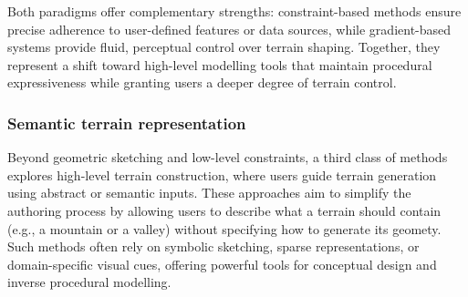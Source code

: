 \smallConclusion

Both paradigms offer complementary strengths: constraint-based methods ensure precise adherence to user-defined features or data sources, while gradient-based systems provide fluid, perceptual control over terrain shaping. Together, they represent a shift toward high-level modelling tools that maintain procedural expressiveness while granting users a deeper degree of terrain control.

\subsubsection{Semantic terrain representation}

Beyond geometric sketching and low-level constraints, a third class of methods explores high-level terrain construction, where users guide terrain generation using abstract or semantic inputs. These approaches aim to simplify the authoring process by allowing users to describe what a terrain should contain (e.g., a mountain or a valley) without specifying how to generate its geomety. Such methods often rely on symbolic sketching, sparse representations, or domain-specific visual cues, offering powerful tools for conceptual design and inverse procedural modelling.


